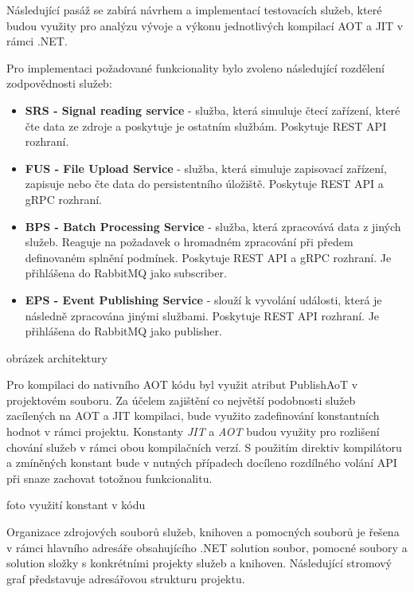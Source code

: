 Následující pasáž se zabírá návrhem a implementací testovacích služeb, které budou využity pro analýzu vývoje a výkonu jednotlivých kompilací AOT a JIT v rámci .NET.


Pro implementaci požadované funkcionality bylo zvoleno následující rozdělení zodpovědnosti služeb:

\begin{itemize}
    \item \textbf{SRS - Signal reading service} - služba, která simuluje čtecí zařízení, které čte data ze zdroje a poskytuje je ostatním službám. Poskytuje REST API rozhraní.
    \item \textbf{FUS - File Upload Service} - služba, která simuluje zapisovací zařízení, zapisuje nebo čte data do persistentního úložiště. Poskytuje REST API a gRPC rozhraní.
    \item \textbf{BPS - Batch Processing Service} - služba, která zpracovává data z jiných služeb. Reaguje na požadavek o hromadném zpracování při předem definovaném splnění podmínek. Poskytuje REST API a gRPC rozhraní. Je přihlášena do RabbitMQ jako subscriber.
    \item \textbf{EPS - Event Publishing Service} - slouží k vyvolání události, která je následně zpracována jinými službami. Poskytuje REST API rozhraní. Je přihlášena do RabbitMQ jako publisher.
\end{itemize}

obrázek architektury

Pro kompilaci do nativního AOT kódu byl využit atribut PublishAoT v projektovém souboru. Za účelem zajištění co největší podobnosti služeb zacílených na AOT a JIT kompilaci, bude využito zadefinování konstantních hodnot v rámci projektu. Konstanty \emph{JIT} a \emph{AOT} budou využity pro rozlišení chování služeb v rámci obou kompilačních verzí. S použitím direktiv kompilátoru a zmíněných konstant bude v nutných případech docíleno rozdílného volání API při snaze zachovat totožnou funkcionalitu.

foto využití konstant v kódu


Organizace zdrojových souborů služeb, knihoven a pomocných souborů je řešena v rámci hlavního adresáře obsahujícího .NET solution soubor, pomocné soubory a solution složky s konkrétními projekty služeb a knihoven. Následující
stromový graf představuje adresářovou strukturu projektu.
    
